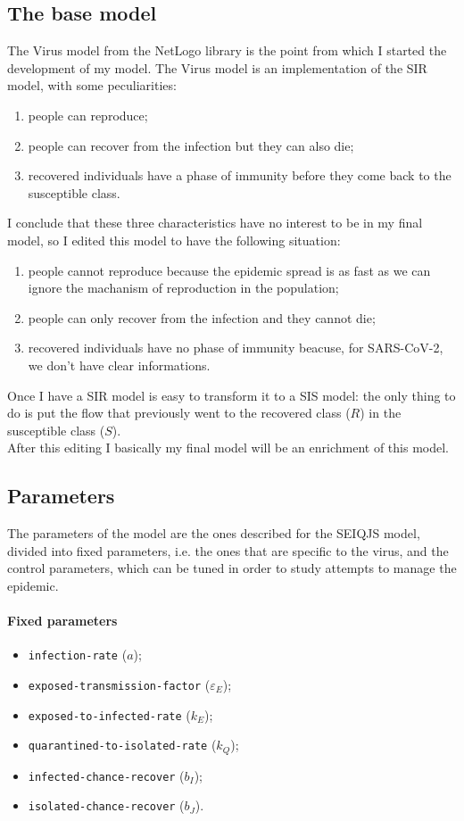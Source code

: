 \documentclass[12pt]{llncs}
\begin{document}
\subsection{The base model}
The Virus model from the NetLogo library \cite{netlogo-virus} is the point from which I started the development of my model. The Virus model is an implementation of the SIR model, with some peculiarities:
\begin{enumerate}
\item people can reproduce;
\item people can recover from the infection but they can also die;
\item recovered individuals have a phase of immunity before they come back to the susceptible class.
\end{enumerate}
I conclude that these three characteristics have no interest to be in my final model, so I edited this model to have the following situation:
\begin{enumerate}
\item people cannot reproduce because the epidemic spread is as fast as we can ignore the machanism of reproduction in the population;
\item people can only recover from the infection and they cannot die;
\item recovered individuals have no phase of immunity beacuse, for SARS-CoV-2, we don't have clear informations.
\end{enumerate}
Once I have a SIR model is easy to transform it to a SIS model: the only thing to do is put the flow that previously went to the recovered class ($R$) in the susceptible class ($S$).\\
After this editing I basically my final model will be an enrichment of this model.

\subsection{Parameters}
The parameters of the model are the ones described for the SEIQJS model, divided into fixed parameters, i.e. the ones that are specific to the virus, and the control parameters, which can be tuned in order to study attempts to manage the epidemic.

\paragraph{Fixed parameters}
\begin{itemize}
\item \texttt{infection-rate} ($a$);
\item \texttt{exposed-transmission-factor} ($\varepsilon_E$);
\item \texttt{exposed-to-infected-rate} ($k_E$);
\item \texttt{quarantined-to-isolated-rate} ($k_Q$);
\item \texttt{infected-chance-recover} ($b_I$);
\item \texttt{isolated-chance-recover} ($b_J$).
\end{itemize}
\end{document}
